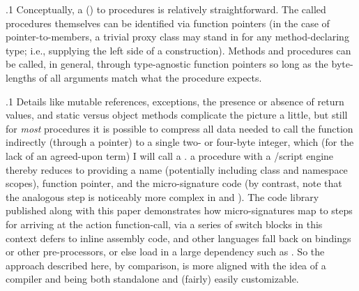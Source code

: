 \documentclass[11pt, twocolumn]{article}
\begin{document}
\p.1{%
Conceptually, a  () to
 procedures is relatively straightforward. The called
procedures themselves can be identified via function
pointers (in the case of pointer-to-members, a trivial
proxy class may stand in for any method-declaring type;
i.e., supplying the left side of a  construction).
Methods and procedures can be called, in general, through
type-agnostic function pointers so long as the byte-lengths
of all arguments match what the procedure expects.
}%

\p.1{%
Details like mutable references, exceptions, the presence
or absence of return values, and static versus object methods
complicate the picture a little, but still for \textit{most}
 procedures it is possible to compress all data needed
to call the function indirectly (through a pointer) to a
single two- or four-byte integer, which (for the lack of an
agreed-upon term) I will call a .
 a  procedure with a /script engine
thereby reduces to providing a name (potentially including
class and namespace scopes), function pointer, and the
micro-signature code (by contrast, note that the analogous
 step is noticeably more complex in  and ).
The code library published along with this paper
demonstrates how micro-signatures map to
steps for arriving at the action function-call,
via a series of switch blocks \mdash{} in this context
 defers to inline assembly code, and
other languages fall back on  bindings
or other pre-processors, or else load in a large
dependency such as . So the approach described
here, by comparison, is more aligned with the
idea of a compiler and  being both standalone and
(fairly) easily customizable.
}%
\end{document}
